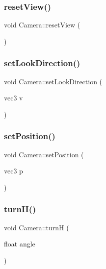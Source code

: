 \mbox{\label{classCamera_ad7e8f779ab27268fe301c3e4db4187a5}} 
\subsubsection{\texorpdfstring{reset\+View()}{resetView()}}
{\footnotesize\ttfamily void Camera\+::reset\+View (\begin{DoxyParamCaption}{ }\end{DoxyParamCaption})}

\mbox{\label{classCamera_ab714eaa26dcdf34a9de4b8aef36b3809}} 
\subsubsection{\texorpdfstring{set\+Look\+Direction()}{setLookDirection()}}
{\footnotesize\ttfamily void Camera\+::set\+Look\+Direction (\begin{DoxyParamCaption}\item[{vec3}]{v }\end{DoxyParamCaption})}

\mbox{\label{classCamera_af00b6bee171d6d24893784589f5fb977}} 
\subsubsection{\texorpdfstring{set\+Position()}{setPosition()}}
{\footnotesize\ttfamily void Camera\+::set\+Position (\begin{DoxyParamCaption}\item[{vec3}]{p }\end{DoxyParamCaption})}

\mbox{\label{classCamera_a9d7b1b2a24086391c13cbdb102564580}} 
\subsubsection{\texorpdfstring{turn\+H()}{turnH()}}
{\footnotesize\ttfamily void Camera\+::turnH (\begin{DoxyParamCaption}\item[{float}]{angle }\end{DoxyParamCaption})}

